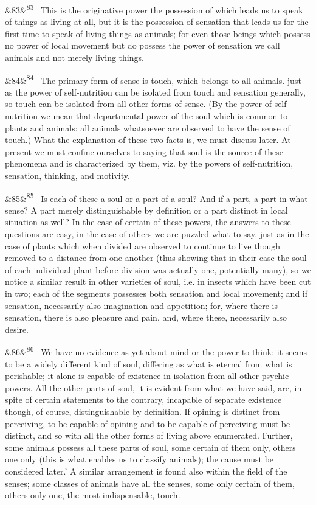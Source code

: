 \documentclass[12pt]{article}
\newcommand{\para}[1][]{\par\noindent\ifx&#1&\else\textsuperscript{\footnotesize #1}~\fi}
\begin{document}
\para[83] This is the originative power the possession of which leads us to speak of things as living at all, but it is the possession of sensation that leads us for the first time to speak of living things as animals; for even those beings which possess no power of local movement but do possess the power of sensation we call animals and not merely living things.

\para[84] The primary form of sense is touch, which belongs to all animals. just as the power of self-nutrition can be isolated from touch and sensation generally, so touch can be isolated from all other forms of sense. (By the power of self-nutrition we mean that departmental power of the soul which is common to plants and animals: all animals whatsoever are observed to have the sense of touch.) What the explanation of these two facts is, we must discuss later. At present we must confine ourselves to saying that soul is the source of these phenomena and is characterized by them, viz. by the powers of self-nutrition, sensation, thinking, and motivity.

\para[85] Is each of these a soul or a part of a soul? And if a part, a part in what sense? A part merely distinguishable by definition or a part distinct in local situation as well? In the case of certain of these powers, the answers to these questions are easy, in the case of others we are puzzled what to say. just as in the case of plants which when divided are observed to continue to live though removed to a distance from one another (thus showing that in their case the soul of each individual plant before division was actually one, potentially many), so we notice a similar result in other varieties of soul, i.e. in insects which have been cut in two; each of the segments possesses both sensation and local movement; and if sensation, necessarily also imagination and appetition; for, where there is sensation, there is also pleasure and pain, and, where these, necessarily also desire.

\para[86] We have no evidence as yet about mind or the power to think; it seems to be a widely different kind of soul, differing as what is eternal from what is perishable; it alone is capable of existence in isolation from all other psychic powers. All the other parts of soul, it is evident from what we have said, are, in spite of certain statements to the contrary, incapable of separate existence though, of course, distinguishable by definition. If opining is distinct from perceiving, to be capable of opining and to be capable of perceiving must be distinct, and so with all the other forms of living above enumerated. Further, some animals possess all these parts of soul, some certain of them only, others one only (this is what enables us to classify animals); the cause must be considered later.' A similar arrangement is found also within the field of the senses; some classes of animals have all the senses, some only certain of them, others only one, the most indispensable, touch.
\end{document}

